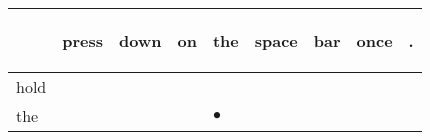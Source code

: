 \documentclass[landscape]{article}
\newcommand{\ssp}{\hspace{2pt}}
\newcommand{\mex}{\cellcolor{g}$\bullet$}
\begin{document}
\noindent\begin{tabular}{|l|p{10pt}|p{10pt}|p{10pt}|p{10pt}|p{10pt}|p{10pt}|p{10pt}|p{10pt}|}
\hline
&\begin{sideways}\cellcolor{ref0}press\hspace{12pt}\end{sideways}&\begin{sideways}\cellcolor{ref1}down\hspace{12pt}\end{sideways}&\begin{sideways}\cellcolor{ref2}on\hspace{12pt}\end{sideways}&\begin{sideways}\cellcolor{ref3}the\hspace{12pt}\end{sideways}&\begin{sideways}\cellcolor{ref4}space\hspace{12pt}\end{sideways}&\begin{sideways}\cellcolor{ref5}bar\hspace{12pt}\end{sideways}&\begin{sideways}\cellcolor{ref6}once\hspace{12pt}\end{sideways}&\begin{sideways}\cellcolor{ref7}.\hspace{12pt}\end{sideways}\\
\hline
\ssp hold \ssp&\hspace{2pt}&\hspace{2pt}&\hspace{2pt}&\hspace{2pt}&\hspace{2pt}&\hspace{2pt}&\hspace{2pt}&\hspace{2pt}\\
\hline
\ssp \cellcolor{ref3}the \ssp&\hspace{2pt}&\hspace{2pt}&\hspace{2pt}&\hspace{2pt}\mex&\hspace{2pt}&\hspace{2pt}&\hspace{2pt}&\hspace{2pt}\\

\end{tabular}
\end{document}
